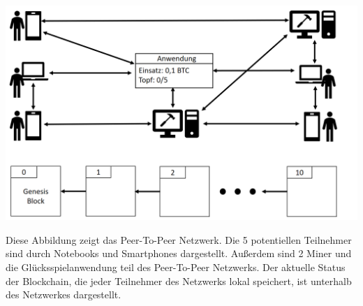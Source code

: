 \vspace{1cm}
\begin{minipage}{0.55\textwidth}
\includegraphics[width=\textwidth]{Figures/konzept_btc/konzept1}
\centering
\decoRule
{}
\label{fig:konzept1}
\end{minipage}
\begin{minipage}{0.45\textwidth}
Diese Abbildung zeigt das Peer-To-Peer Netzwerk. Die 5 potentiellen Teilnehmer sind durch Notebooks und Smartphones dargestellt. Außerdem sind 2 Miner und die Glücksspielanwendung teil des Peer-To-Peer Netzwerks. Der aktuelle Status der Blockchain, die jeder Teilnehmer des Netzwerks lokal speichert, ist unterhalb des Netzwerkes dargestellt.
\end{minipage}

